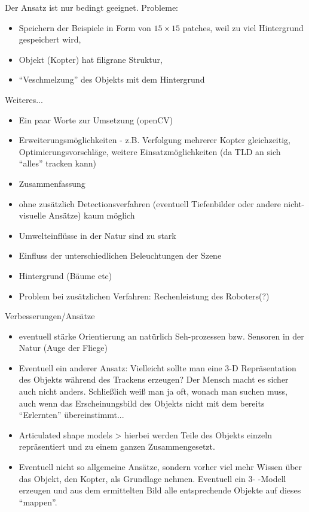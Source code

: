 Der Ansatz ist nur bedingt geeignet. Probleme:
\begin{itemize}
\item Speichern der Beispiele in Form von $15\times15$ patches, weil zu viel Hintergrund gespeichert wird,
\item Objekt (Kopter) hat filigrane Struktur,
\item ``Veschmelzung'' des Objekts mit dem Hintergrund
\end{itemize}
Weiteres...
\begin{itemize}
\item Ein paar Worte zur Umsetzung (openCV)
\item Erweiterungsmöglichkeiten - z.B. Verfolgung mehrerer Kopter gleichzeitig, Optimierungsvorschläge, weitere Einsatzmöglichkeiten (da TLD an sich ``alles'' tracken kann)
\item Zusammenfassung
\item ohne zusätzlich Detectionsverfahren (eventuell Tiefenbilder oder andere nicht-visuelle Ansätze) kaum möglich
\item Umwelteinflüsse in der Natur sind zu stark
\item Einfluss der unterschiedlichen Beleuchtungen der Szene
\item Hintergrund (Bäume etc)
\item Problem bei zusätzlichen Verfahren: Rechenleistung des Roboters(?)
\end{itemize}
Verbesserungen/Ansätze
\begin{itemize}
\item eventuell stärke Orientierung an natürlich Seh-prozessen bzw. Sensoren in der Natur (Auge der Fliege)
\item Eventuell ein anderer Ansatz: Vielleicht sollte man eine 3-D Repräsentation des Objekts während des Trackens erzeugen? Der Mensch macht es sicher auch nicht anders. Schließlich weiß man ja oft, wonach man suchen muss, auch wenn das Erscheinungsbild des Objekts nicht mit dem bereits ``Erlernten'' übereinstimmt...
\item Articulated shape models > hierbei werden Teile des Objekts einzeln repräsentiert und zu einem ganzen Zusammengesetzt. 
\item Eventuell nicht so allgemeine Ansätze, sondern vorher viel mehr Wissen über das Objekt, den Kopter, als Grundlage nehmen. Eventuell ein 3- -Modell erzeugen und aus dem ermittelten Bild alle entsprechende Objekte auf dieses ``mappen''. 
\end{itemize}